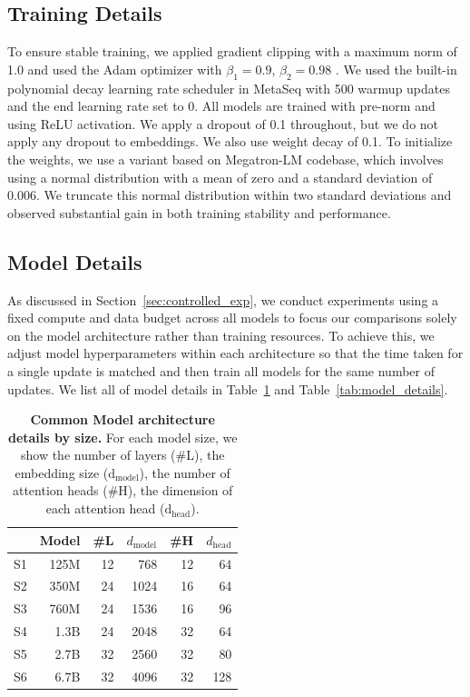 \documentclass{article}
\theoremstyle{plain}
\theoremstyle{definition}
\theoremstyle{remark}
\begin{document}
\subsection{Training Details}
\label{subsec:append_training}
    To ensure stable training, we applied gradient clipping with a maximum norm of 1.0 and used the Adam optimizer with $\beta_1 = 0.9$, $\beta_2 = 0.98$ \cite{ADAM}. We used the built-in polynomial decay learning rate scheduler in MetaSeq with 500 warmup updates and the end learning rate set to 0. All models are trained with pre-norm and using ReLU activation. We apply a dropout of 0.1 throughout, but we do not apply any dropout to embeddings. We also use weight decay of 0.1. To initialize the weights, we use a variant based on Megatron-LM codebase, which involves using a normal distribution with a mean of zero and a standard deviation of 0.006. We truncate this normal distribution within two standard deviations and observed substantial gain in both training stability and performance.


\subsection{Model Details}
\label{subsec:apend_modl}

As discussed in Section~\ref{sec:controlled_exp}, we conduct experiments using a fixed compute and data budget across all models to focus our comparisons solely on the model architecture rather than training resources. To achieve this, we adjust model hyperparameters within each architecture so that the time taken for a single update is matched and then train all models for the same number of updates. We list all of model details in Table~\ref{table:opt_model_desc} and Table~\ref{tab:model_details}. 

\begin{table}[h]
\centering
\begin{tabular}{lrrrrr}
\toprule
{} & Model & \#L & $d_{\text{model}}$ & \#H & $d_{\text{head}}$  \\ \midrule
S1 & 125M  & 12  & 768  & 12  & 64     \\
S2 & 350M  & 24  & 1024 & 16  & 64         \\
S3 & 760M  & 24  & 1536 & 16  & 96       \\
S4 & 1.3B  & 24  & 2048 & 32  & 64       \\
S5 & 2.7B  & 32  & 2560 & 32  & 80       \\
S6 & 6.7B  & 32  & 4096 & 32  & 128      \\
\bottomrule
\end{tabular}
\caption{\textbf{Common Model architecture details by size.} For each model size, we show the number of layers (\#L), the embedding size ($\text{d}_\text{model}$), the number of attention heads (\#H), the dimension of each attention head ($\text{d}_\text{head}$).}
\label{table:opt_model_desc}
\end{table}
\end{document}
